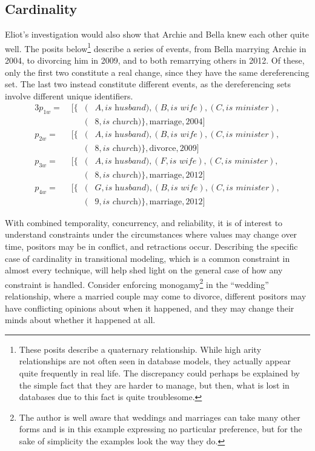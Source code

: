 \documentclass[sfsidenotes,nobib,twoside,symmetric]{tufte-handout}
\begin{document}
\subsection{Cardinality}
%

Eliot's investigation would also show that Archie and Bella knew each other quite well. The posits below\footnote{These posits describe a quaternary relationship. While high arity relationships are not often seen in database models, they actually appear quite frequently in real life. The discrepancy could perhaps be explained by the simple fact that they are harder to manage, but then, what is lost in databases due to this fact is quite troublesome.} describe a series of events, from Bella marrying Archie in 2004, to divorcing him in 2009, and to both remarrying others in 2012. Of these, only the first two constitute a real change, since they have the same dereferencing set. The last two instead constitute different events, as the dereferencing sets involve different unique identifiers. 
\begin{alignat*}{3}
p_{1w} =\;& [\{&(&A, \textit{is husband}),(B, \textit{is wife}),(C, \textit{is minister}), \\
&&(&8, \textit{is church})\}, \textrm{marriage}, 2004] \\
p_{2w} =\;& [\{&(&A, \textit{is husband}),(B, \textit{is wife}),(C, \textit{is minister}), \\
&&(&8, \textit{is church})\}, \textrm{divorce}, 2009] \\
p_{3w} =\;& [\{&(&A, \textit{is husband}),(F, \textit{is wife}),(C, \textit{is minister}), \\
&&(&8, \textit{is church})\}, \textrm{marriage}, 2012] \\
p_{4w} =\;& [\{&(&G, \textit{is husband}),(B, \textit{is wife}),(C, \textit{is minister}), \\
&&(&9, \textit{is church})\}, \textrm{marriage}, 2012] 
\end{alignat*}

With combined temporality, concurrency, and reliability, it is of interest to understand constraints under the circumstances where values may change over time, positors may be in conflict, and retractions occur. Describing the specific case of cardinality in transitional modeling, which is a common constraint in almost every technique, will help shed light on the general case of how any constraint is handled. Consider enforcing monogamy\footnote{The author is well aware that weddings and marriages can take many other forms and is in this example expressing no particular preference, but for the sake of simplicity the examples look the way they do.} in the \enquote{wedding} relationship, where a married couple may come to divorce, different positors may have conflicting opinions about when it happened, and they may change their minds about whether it happened at all.   
\end{document}
